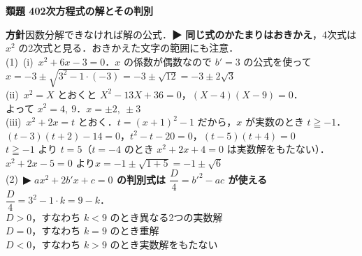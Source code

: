 \documentclass[a4paper,11pt]{ltjsarticle}
\newcommand{\ans}[2]{\Needspace{5\baselineskip}\vspace{6pt}%
  {\sffamily\bfseries 類題 #1\quad #2}\par}
\newcommand{\point}[1]{\textsf{\bfseries ▶ #1}}
\begin{document}
\ans{40}{2次方程式の解とその判別}
\begin{kai}
\textbf{方針}\quad 因数分解できなければ解の公式．\point{同じ式のかたまりはおきかえ}，4次式は $x^2$ の2次式と見る．おきかえた文字の範囲にも注意．\\[2pt]
(1)\ (i)\ $x^2+6x-3=0$．$x$ の係数が偶数なので $b'=3$ の公式を使って\\
\hspace*{1.5em}$x=-3\pm\sqrt{3^2-1\cdot(-3)}=-3\pm\sqrt{12}=-3\pm2\sqrt3$\\[2pt]
\hspace*{1.5em}(ii)\ $x^2=X$ とおくと $X^2-13X+36=0$，$(X-4)(X-9)=0$．\\
\hspace*{1.5em}よって $x^2=4,\ 9$．\quad $x=\pm2,\ \pm3$\\[2pt]
\hspace*{1.5em}(iii)\ $x^2+2x=t$ とおく．$t=(x+1)^2-1$ だから，$x$ が実数のとき $t\geqq-1$．\\
\hspace*{1.5em}$(t-3)(t+2)-14=0$，\quad $t^2-t-20=0$，\quad $(t-5)(t+4)=0$\\
\hspace*{1.5em}$t\geqq-1$ より $t=5$（$t=-4$ のとき $x^2+2x+4=0$ は実数解をもたない）．\\
\hspace*{1.5em}$x^2+2x-5=0$ より\quad $x=-1\pm\sqrt{1+5}=-1\pm\sqrt6$\\[2pt]
(2)\ \point{$ax^2+2b'x+c=0$ の判別式は $\dfrac D4=b'^2-ac$ が使える}\\
\hspace*{1.5em}$\dfrac D4=3^2-1\cdot k=9-k$．\\
\hspace*{1.5em}$D>0$，すなわち $k<9$ のとき\quad 異なる2つの実数解\\
\hspace*{1.5em}$D=0$，すなわち $k=9$ のとき\quad 重解\\
\hspace*{1.5em}$D<0$，すなわち $k>9$ のとき\quad 実数解をもたない
\end{kai}
\end{document}
